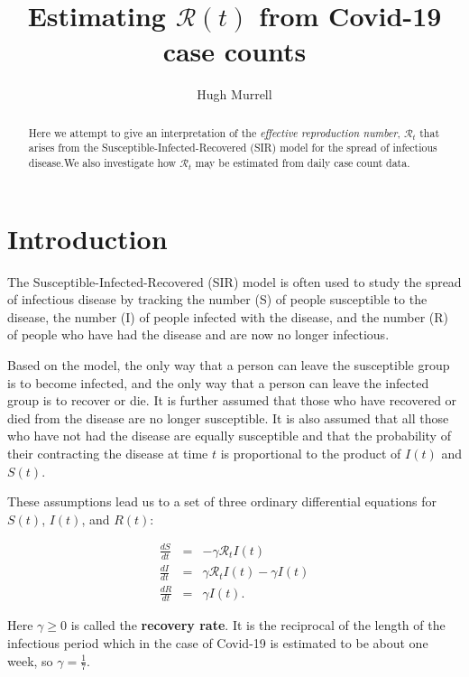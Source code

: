\documentclass[11pt]{article}
\begin{document}
\title{Estimating $\mathcal{R}(t)$ from Covid-19 case counts}
\author{ Hugh Murrell}
\maketitle

\begin{abstract}
Here we attempt to give an interpretation of
the {\it effective reproduction number}, $\mathcal{R}_t$ that arises
from the Susceptible-Infected-Recovered (SIR) model 
for the spread of infectious disease.We also investigate how
 $\mathcal{R}_t$ may be estimated from daily case count data.
\end{abstract}

\section{Introduction}
The Susceptible-Infected-Recovered (SIR) model \cite{Wikipedia} is often used 
to study the spread of infectious disease by tracking the number (S) of people 
susceptible to the disease, the number (I) of people infected with the disease, 
and the number (R) of people who have had the disease and are now no
longer infectious.  

Based on the model, the only way that a person can leave the susceptible
group is to become infected, and the only way that a person can leave the
infected group is to recover or die.  It is further assumed that those
who have recovered or died from the disease are no longer susceptible.
 It is also assumed 
that all those who have not had the disease are equally susceptible
and that the probability of their contracting the disease at time $t$
is proportional to the product of $I(t)$ and $S(t)$. 

These assumptions lead us to a set of three ordinary differential equations
for $S(t)$, $I(t)$, and $R(t)$:

\begin{eqnarray}
\frac{dS}{dt} & = & - \gamma \mathcal{R}_t I(t) \label{eq2a} \\
\frac{dI}{dt} & = & \gamma \mathcal{R}_t I(t) - \gamma I(t) \label{eq2b} \\
\frac{dR}{dt} & = & \gamma I(t) . \label{eq2c}
\end{eqnarray}

Here $\gamma \geq 0$ is called the {\bf recovery rate}.
It is the reciprocal of the length of the infectious period which in the case of
Covid-19 is estimated to be about one week, so $\gamma = \frac{1}{7}$.
\end{document}
